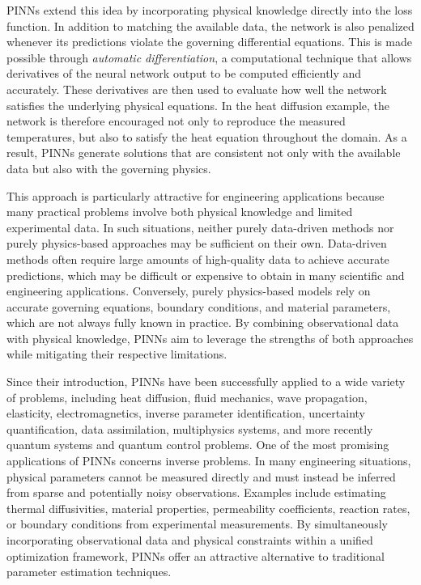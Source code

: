 PINNs extend this idea by incorporating physical knowledge directly into the loss function. In addition to matching the available data, the network is also penalized whenever its predictions violate the governing differential equations. This is made possible through \textit{automatic differentiation}, a computational technique that allows derivatives of the neural network output to be computed efficiently and accurately. These derivatives are then used to evaluate how well the network satisfies the underlying physical equations. In the heat diffusion example, the network is therefore encouraged not only to reproduce the measured temperatures, but also to satisfy the heat equation throughout the domain. As a result, PINNs generate solutions that are consistent not only with the available data but also with the governing physics.

This approach is particularly attractive for engineering applications because many practical problems involve both physical knowledge and limited experimental data. In such situations, neither purely data-driven methods nor purely physics-based approaches may be sufficient on their own. Data-driven methods often require large amounts of high-quality data to achieve accurate predictions, which may be difficult or expensive to obtain in many scientific and engineering applications. Conversely, purely physics-based models rely on accurate governing equations, boundary conditions, and material parameters, which are not always fully known in practice. By combining observational data with physical knowledge, PINNs aim to leverage the strengths of both approaches while mitigating their respective limitations.

Since their introduction, PINNs have been successfully applied to a wide variety of problems, including heat diffusion, fluid mechanics, wave propagation, elasticity, electromagnetics, inverse parameter identification, uncertainty quantification, data assimilation, multiphysics systems, and more recently quantum systems and quantum control problems. One of the most promising applications of PINNs concerns inverse problems. In many engineering situations, physical parameters cannot be measured directly and must instead be inferred from sparse and potentially noisy observations. Examples include estimating thermal diffusivities, material properties, permeability coefficients, reaction rates, or boundary conditions from experimental measurements. By simultaneously incorporating observational data and physical constraints within a unified optimization framework, PINNs offer an attractive alternative to traditional parameter estimation techniques.

